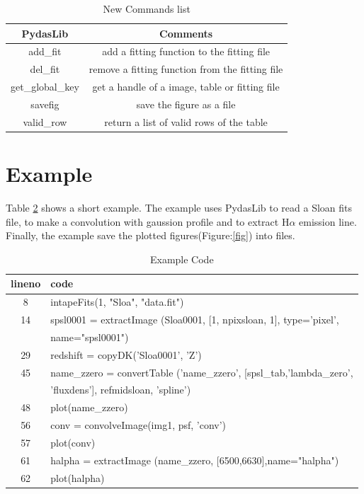 \documentclass[11pt,twoside]{article}
\begin{document}
\begin{table}[!hb]
\begin{center}
\caption{New Commands list}
\label{new-commands}
\begin{tabular}{c|c}
\hline
 PydasLib & Comments\\
\hline 
\hline
 add\_fit  & add a fitting function to the fitting file\\
del\_fit & remove a fitting function from the fitting file \\
get\_global\_key & get a handle of a image, table or fitting file\\
savefig &  save the figure as a file\\
valid\_row & return a list of valid rows of the table\\
\hline
\hline
\end{tabular}
\end{center}
\end{table}
          \section{Example }%
Table \ref{code} shows a short example. The example uses PydasLib to read a Sloan fits file, to make a convolution with gaussion profile and to extract H$\alpha$ emission line. Finally, the example save the plotted figures(Figure:\ref{fig}) into files.

\begin{table}[!hb]
\begin{center}
\caption{Example Code}
\label{code}
\begin{tabular}{cl}
lineno & code\\
\hline
8 & intapeFits(1, "Sloa", "data.fit")  \\
14 & spsl0001 = extractImage (Sloa0001, [1, npixsloan, 1], type='pixel', \\
  & name="spsl0001")\\
29 & redshift = copyDK('Sloa0001', 'Z')  \\
45 & name\_zzero = convertTable ('name\_zzero', [spsl\_tab,'lambda\_zero',\\
   & 'fluxdens'], refmidsloan, 'spline')\\
48 & plot(name\_zzero)\\
56 & conv = convolveImage(img1, psf, 'conv') \\
57 & plot(conv)\\
61 & halpha = extractImage (name\_zzero, [6500,6630],name="halpha") \\
62 & plot(halpha)\\
\end{tabular}
\end{center}
\end{table}
	 
\end{document}
